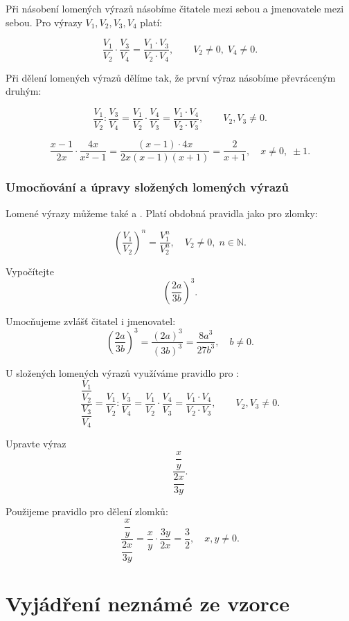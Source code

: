 \documentclass[12pt,a4paper]{article}
\begin{document}
Při násobení lomených výrazů násobíme čitatele mezi sebou a jmenovatele mezi sebou.  
Pro výrazy $V_1, V_2, V_3, V_4$ platí:

\[
\frac{V_1}{V_2} \cdot \frac{V_3}{V_4}
= \frac{V_1\cdot V_3}{V_2\cdot V_4}, 
\qquad V_2 \neq 0, \; V_4 \neq 0.
\]

Při dělení lomených výrazů dělíme tak, že první výraz násobíme převráceným druhým:  

\[
\frac{V_1}{V_2} : \frac{V_3}{V_4}
= \frac{V_1}{V_2} \cdot \frac{V_4}{V_3}
= \frac{V_1\cdot V_4}{V_2\cdot V_3},
\qquad V_2, V_3 \neq 0.
\]

\begin{examplebox}
\[
\frac{x-1}{2x} \cdot \frac{4x}{x^2-1}
= \frac{(x-1)\cdot 4x}{2x(x-1)(x+1)}
= \frac{2}{x+1}, \quad x \neq 0, \; \pm 1.
\]
\end{examplebox}


\subsubsection*{Umocňování a úpravy složených lomených výrazů}

Lomené výrazy můžeme také  a .  
Platí obdobná pravidla jako pro zlomky:

\[
\left(\frac{V_1}{V_2}\right)^n = \frac{V_1^n}{V_2^n}, \quad V_2 \neq 0, \; n \in \mathbb{N}.
\]


\begin{examplebox}
Vypočítejte
\[
\left(\frac{2a}{3b}\right)^3.
\]

Umocňujeme zvlášť čitatel i jmenovatel:
\[
\left(\frac{2a}{3b}\right)^3
= \frac{(2a)^3}{(3b)^3}
= \frac{8a^3}{27b^3}, \quad b \neq 0.
\]
\end{examplebox}


U složených lomených výrazů využíváme pravidlo pro :
\[
\dfrac{\dfrac{V_1}{V_2}}{\dfrac{V_3}{V_4}}
= \frac{V_1}{V_2} : \frac{V_3}{V_4}
= \frac{V_1}{V_2} \cdot \frac{V_4}{V_3}
= \frac{V_1 \cdot V_4}{V_2 \cdot V_3},
\qquad V_2, V_3 \neq 0.
\]
\begin{examplebox}
Upravte výraz
\[
\dfrac{\dfrac{x}{y}}{\dfrac{2x}{3y}}.
\]

Použijeme pravidlo pro dělení zlomků:
\[
\dfrac{\dfrac{x}{y}}{\dfrac{2x}{3y}}
= \frac{x}{y} \cdot \frac{3y}{2x}
= \frac{3}{2}, \quad x,y \neq 0.
\]
\end{examplebox}


\newpage
\section{Vyjádření neznámé ze vzorce}
\end{document}
